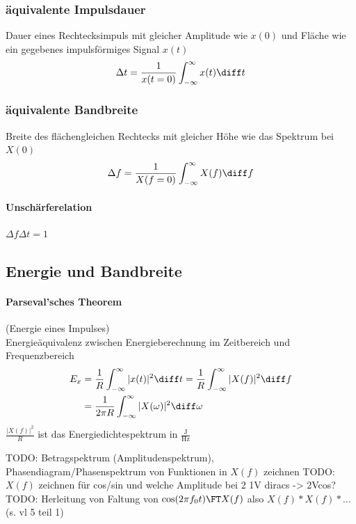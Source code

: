 \begin{sectionbox}
    \subsubsection{äquivalente Impulsdauer}
    Dauer eines Rechtecksimpuls mit gleicher Amplitude wie $x(0)$ und Fläche wie ein gegebenes impulsförmiges Signal $x(t)$
    \begin{equation*}
        \Delta t = \frac{1}{x(t=0)}\int_{-\infty}^\infty x(t)\diff t
    \end{equation*}

    \subsubsection{äquivalente Bandbreite}
    Breite des flächengleichen Rechtecks mit gleicher Höhe wie das Spektrum bei $X(0)$
    \begin{equation*}
        \Delta f = \frac{1}{X(f=0)}\int_{-\infty}^\infty X(f)\diff f
    \end{equation*}

    \paragraph{Unschärferelation} $\Delta f \Delta t = 1$
\end{sectionbox}

\subsection{Energie und Bandbreite}
\begin{emphbox}
    \paragraph{Parseval'sches Theorem} (Energie eines Impulses) \\
    Energieäquivalenz zwischen Energieberechnung im Zeitbereich und Frequenzbereich
    \begin{align*}
        E_x & =\frac{1}{R}\int_{-\infty}^{\infty}|x(t)|^2\diff t=\frac{1}{R}\int_{-\infty}^{\infty}|X(f)|^2\diff f \\
            & =\frac{1}{2\pi R}\int_{-\infty}^{\infty}|X(\omega)|^2\diff\omega
    \end{align*}
    $\frac{|X(f)|^2}{R}$ ist das Energiedichtespektrum in $\frac{\mathrm{J}}{\mathrm{Hz}}$
\end{emphbox}

TODO: Betragspektrum (Amplitudenspektrum), Phasendiagram/Phasenspektrum von Funktionen in $X(f)$ zeichnen
TODO: $X(f)$ zeichnen für cos/sin und welche Amplitude bei 2 1V diracs -> 2Vcos?
TODO: Herleitung von Faltung von $\cos(2\pi f_0 t) \FT X(f)$ also $X(f) * X(f) * ...$ (s. vl 5 teil 1)